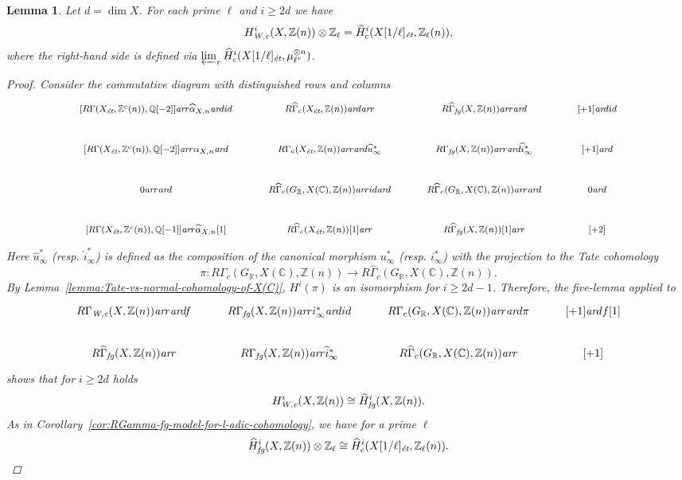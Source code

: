 \documentclass[leqno,12pt]{article}
\theoremstyle{plain}
\newtheorem{lemma}[theorem]{\indent\sc Lemma}
\theoremstyle{definition}
\newcommand{\CC}{\mathbb{C}}
\newcommand{\QQ}{\mathbb{Q}}
\newcommand{\RR}{\mathbb{R}}
\newcommand{\ZZ}{\mathbb{Z}}
\newcommand{\Wc}{\text{\it W,c}}
\newcommand{\ar}{\text{\it ar}}
\newcommand{\et}{\text{\it \'{e}t}}
\newcommand{\fg}{\text{\it fg}}
\begin{document}
\begin{lemma}
  Let $d = \dim X$. For each prime $\ell$ and $i \ge 2d$ we have
  \begin{equation}
    \label{eqn:l-adic-completion-of-H-Wc}
    H^i_\Wc (X, \ZZ (n)) \otimes \ZZ_\ell =
    \widehat{H}_c^i (X [1/\ell]_\et, \ZZ_\ell (n)),
  \end{equation}
  where the right-hand side is defined via
  $\varprojlim_r \widehat{H}_c^i (X [1/\ell]_\et, \mu_{\ell^r}^{\otimes n})$.

  \begin{proof}
    Consider the commutative diagram with distinguished rows and columns
    \[ \begin{tikzcd}[font=\footnotesize]
        {[R\Gamma (X_\et, \ZZ^c(n)), \QQ[-2]]} \ar{r}{\widehat{\alpha}_{X,n}} \ar{d}{id} & R\widehat{\Gamma}_c (X_\et, \ZZ(n)) \ar{d} \ar{r} & R\widehat{\Gamma}_\fg (X, \ZZ(n)) \ar{r}\ar{d} & {[+1]} \ar{d}{id} \\
        {[R\Gamma (X_\et, \ZZ^c(n)), \QQ[-2]]} \ar{r}{\alpha_{X,n}} \ar{d} & R\Gamma_c (X_\et, \ZZ(n)) \ar{r} \ar{d}{\widehat{u}^*_\infty} & R\Gamma_\fg (X, \ZZ(n)) \ar{r} \ar{d}{\widehat{i}^*_\infty} & {[+1]} \ar{d} \\
        0 \ar{r}\ar{d} & R\widehat{\Gamma}_c (G_\RR, X(\CC), \ZZ(n)) \ar{r}{id} \ar{d} & R\widehat{\Gamma}_c (G_\RR, X(\CC), \ZZ(n)) \ar{r} \ar{d} & 0 \ar{d} \\
        {[R\Gamma (X_\et, \ZZ^c(n)), \QQ[-1]]} \ar{r}{\widehat{\alpha}_{X,n} [1]} & R\widehat{\Gamma}_c (X_\et, \ZZ(n)) [1] \ar{r} & R\widehat{\Gamma}_\fg (X, \ZZ(n)) [1] \ar{r} & {[+2]}
      \end{tikzcd} \]
    Here $\widehat{u}^*_\infty$ (resp. $\widehat{i}^*_\infty$) is defined as the
    composition of the canonical morphism $u^*_\infty$ (resp. $i^*_\infty$) with
    the projection to the Tate cohomology
    \[ \pi\colon R\Gamma_c (G_\RR, X(\CC), \ZZ(n)) \to
      R\widehat{\Gamma}_c (G_\RR, X(\CC), \ZZ(n)). \]
    By Lemma~\ref{lemma:Tate-vs-normal-cohomology-of-X(C)}, $H^i (\pi)$ is an
    isomorphism for $i \ge 2d-1$. Therefore, the five-lemma applied to
    \[ \begin{tikzcd}
        R\Gamma_\Wc (X, \ZZ(n)) \ar{r}\ar{d}{f} & R\Gamma_\fg (X, \ZZ(n)) \ar{r}{i^*_\infty}\ar{d}{id} & R\Gamma_c (G_\RR, X(\CC), \ZZ(n)) \ar{r}\ar{d}{\pi} & {[+1]}\ar{d}{f [1]} \\
        R\widehat{\Gamma}_\fg (X, \ZZ(n)) \ar{r} & R\Gamma_\fg (X, \ZZ(n)) \ar{r}{\widehat{i}^*_\infty} & R\widehat{\Gamma}_c (G_\RR, X(\CC), \ZZ(n)) \ar{r} & {[+1]}
      \end{tikzcd} \]
    shows that for $i \ge 2d$ holds
    \[ H^i_\Wc (X, \ZZ(n)) \cong \widehat{H}^i_\fg (X, \ZZ(n)). \]
    As in Corollary~\ref{cor:RGamma-fg-model-for-l-adic-cohomology}, we have for a
    prime $\ell$
    \[ \widehat{H}^i_\fg (X, \ZZ(n)) \otimes \ZZ_\ell \cong \widehat{H}^i_c (X[1/\ell]_\et, \ZZ_\ell (n)). \qedhere \]
  \end{proof}
\end{lemma}
\end{document}
